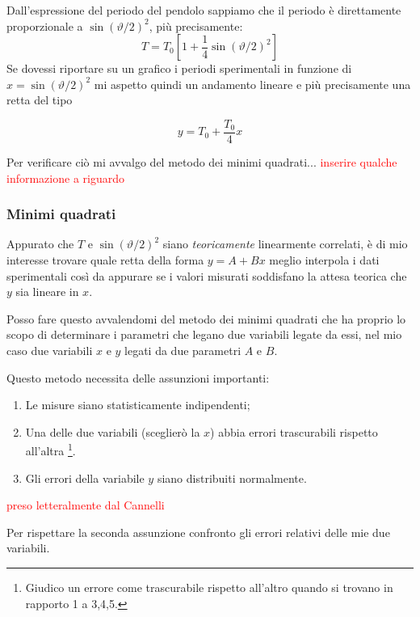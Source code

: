 \documentclass{article}
\begin{document}
\noindent
Dall'espressione del periodo del pendolo sappiamo che il periodo è direttamente proporzionale a $\sin\left(\vartheta/2\right)^2$, più precisamente:
\[
T = T_0 \left[ 1 + \frac{1}{4}\sin{\left(\vartheta/2\right)}^2 \right]
\]
Se dovessi riportare su un grafico i periodi sperimentali in funzione di $x = \sin{\left(\vartheta/2\right)}^2$ mi aspetto quindi un andamento lineare e più precisamente una retta del tipo

\[
y = T_0 + \frac{T_0}{4}x
\]

\noindent
Per verificare ciò mi avvalgo del metodo dei minimi quadrati...
\textcolor{red}{inserire qualche informazione a riguardo}

\subsubsection{Minimi quadrati}
Appurato che $T$ e $\sin{\left(\vartheta/2\right)}^2$ siano \textit{teoricamente} linearmente correlati, è di mio interesse trovare quale retta della forma $y = A + Bx$ meglio interpola i dati sperimentali così da appurare se i valori misurati soddisfano la attesa teorica che $y$ sia lineare in $x$. 

Posso fare questo avvalendomi del metodo dei minimi quadrati che ha  proprio lo scopo di determinare i parametri che legano due variabili legate da essi, nel mio caso due variabili $x$ e $y$ legati da due parametri $A$ e $B$.

\vspace{2cm}
Questo metodo necessita delle assunzioni importanti: 

\begin{enumerate}
	\item Le misure siano statisticamente indipendenti;
	\item Una delle due variabili (sceglierò la $x$) abbia errori trascurabili rispetto all'altra \footnote{Giudico un errore come trascurabile rispetto all'altro quando si trovano in rapporto 1 a 3,4,5.}.
	\item Gli errori della variabile $y$ siano distribuiti normalmente.
\end{enumerate}
\textcolor{red}{preso letteralmente dal Cannelli}

Per rispettare la seconda assunzione confronto gli errori relativi delle mie due variabili.
\end{document}
